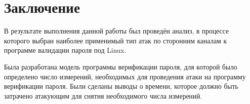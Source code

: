 \section{Заключение} \label{sec:summary}

В результате выполнения данной работы был проведён анализ, в процессе
которого выбран наиболее применимый тип атак
по сторонним каналам к программе валидации пароля под Linux.

Была разработана модель программы верификации пароля, для которой
было определено число измерений, необходимых для проведения атаки
на программу верификации пароля. Были сделаны выводы о времени,
которое должно быть затрачено атакующим для снятия необходимого
числа измерений.

\clearpage
